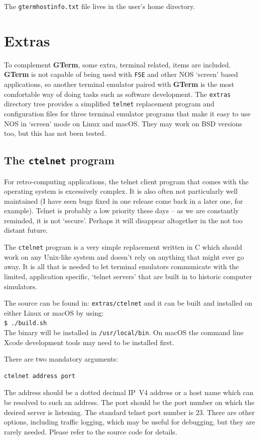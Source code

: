 \documentclass[a4paper,twoside,11pt]{article}
\newcommand{\newpara}{\par\vspace{4mm}\noindent}
\begin{document}
\newpara
The \texttt{gtermhostinfo.txt} file lives in the user's home directory.


\section{Extras}
To complement \textbf{GTerm}, some extra, terminal related, items are included. \textbf{GTerm} is not capable of being used with \texttt{FSE} and
other NOS `screen' based applications, so another terminal emulator paired with \textbf{GTerm} is the most comfortable way of doing
tasks such as software development. The \texttt{extras} directory tree provides a simplified \texttt{telnet} replacement program and configuration files
for three terminal emulator programs that make it easy to use NOS in `screen' mode on Linux and macOS. They may work on BSD versions too,
but this has not been tested.

\subsection{The \texttt{ctelnet} program}
For retro-computing applications, the telnet client
program that comes with the operating system is excessively complex. It is also often not particularly well 
maintained (I have seen bugs fixed in one release come back in a later one, for example). Telnet is probably a low priority these days -- as we
are constantly reminded, it is not `secure'. Perhaps it will disappear altogether in the not too distant future.

\newpara
The \texttt{ctelnet} program is a very simple replacement written in C which should work on any Unix-like system 
and doesn't rely on anything that might
ever go away. It is all that is needed to let terminal emulators communicate with the limited, application specific, `telnet servers' that are built in to
historic computer simulators.

\newpara
The source can be found in: \texttt{extras/ctelnet} and it can be built and installed on either Linux or macOS by using:\\
\texttt{\$ ./build.sh}\\
The binary will be installed in \texttt{/usr/local/bin}. On macOS the command line Xcode development tools may need to be installed first. 

\newpara
There are two mandatory arguments:
\begin{verbatim}
ctelnet address port
\end{verbatim}
The address should be a dotted decimal IP~V4 address or a host name which can be resolved to such an address. The port should be the
port number on which the desired server is listening. The standard telnet port number is 23. There are other options, including traffic logging,
which may be useful for debugging, but they are rarely needed. Please refer to the source code for details.
\end{document}
